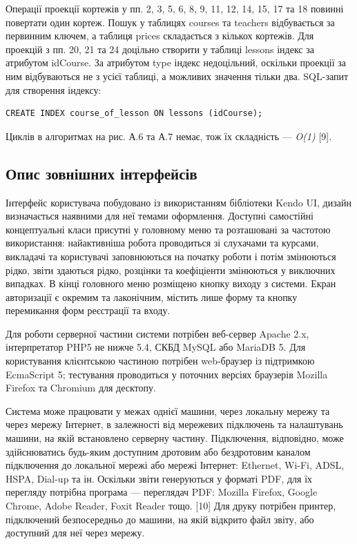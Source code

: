 Операції проекції кортежів у пп. 2, 3, 5, 6, 8, 9, 11, 12, 14, 15, 17 та 18 повинні повертати один кортеж. Пошук у таблицях courses та teachers відбувається за первинним ключем, а таблиця prices складається з кількох кортежів. Для проекцій з пп. 20, 21 та 24 доцільно створити у таблиці lessons індекс за атрибутом idCourse. За атрибутом type індекс недоцільний, оскільки проекції за ним відбуваються не з усієї таблиці, а можливих значення тільки два. SQL-запит для створення індексу:

{ \fontsize{11pt}{12pt} \selectfont
\begin{verbatim}
CREATE INDEX course_of_lesson ON lessons (idCourse);
\end{verbatim}
}

Циклів в алгоритмах на рис. А.6 та А.7 немає, тож їх складність --- \emph{O(1)} [9].

\bigbreak
\subsection{Опис зовнішних інтерфейсів}
\bigbreak
Інтерфейс користувача побудовано із використанням бібліотеки Kendo UI, дизайн визначається наявними для неї темами оформлення. Доступні самостійні концептуальні класи присутні у головному меню та розташовані за частотою використання: найактивніша робота проводиться зі слухачами та курсами, викладачі та користувачі заповнюються на початку роботи і потім змінюються рідко, звіти здаються рідко, розцінки та коефіціенти змінюються у виключних випадках. В кінці головного меню розміщено кнопку виходу з системи. Екран авторизації є окремим та лаконічним, містить лише форму та кнопку перемикання форм реєстрації та входу.

Для роботи серверної частини системи потрібен веб-сервер Apache 2.x, інтерпретатор PHP5 не нижче 5.4, СКБД MySQL або MariaDB 5. Для користування клієнтською частиною потрібен web-браузер із підтримкою EcmaScript 5; тестування проводиться у поточних версіях браузерів Mozilla Firefox та Chromium для десктопу.

Система може працювати у межах однієї машини, через локальну мережу та через мережу Інтернет, в залежності від мережевих підключень та налаштувань машини, на якій встановлено серверну частину. Підключення, відповідно, може здійснюватись будь-яким доступним дротовим або бездротовим каналом підключення до локальної мережі або мережі Інтернет: Ethernet, Wi-Fi, ADSL, HSPA, Dial-up та ін. Оскільки звіти генеруються у форматі PDF, для їх перегляду потрібна програма --- переглядач PDF: Mozilla Firefox, Google Chrome, Adobe Reader, Foxit Reader тощо. [10] Для друку потрібен принтер, підключений безпосередньо до машини, на якій відкрито файл звіту, або доступний для неї через мережу.
